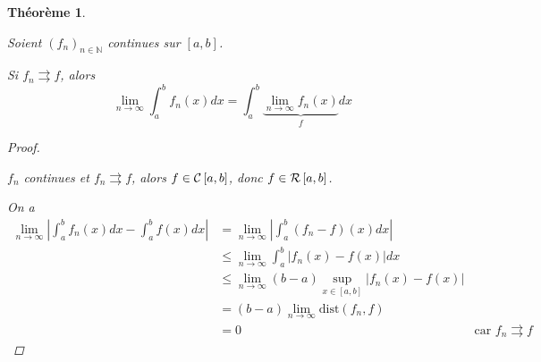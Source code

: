 \documentclass{report}
\newcommand*{\dlim}[3]{\displaystyle\lim_{#1 \to #2}#3}
\newcommand*{\dint}[3]{\displaystyle\int_{#1}^{#2}#3}
\newcommand*{\abs}[1]{\left| #1 \right|}
\newcommand*{\convuni}{\rightrightarrows}
\newcommand*{\lte}{\leqslant}
\newcommand*{\naturels}{\mathbb{N}}
\newtheorem*{thm}{Th\'eor\`eme}
\theoremstyle{definition}
\theoremstyle{remark}
\begin{document}
	\begin{thm}~

		Soient $(f_n)_{n \in \naturels}$ continues sur $[a,b]$.

		Si $f_n \convuni f$, alors
		\[
		\dlim{n}{\infty}{\dint{a}{b}{f_n(x)dx}} = \dint{a}{b}{\underbrace{\dlim{n}{\infty}{f_n(x)}}_{f}dx}
		\]
		\begin{proof}~

			$f_n$ continues et $f_n \convuni f$, alors $f \in \continue$, donc $f \in \riemann$.

			On a
			\begin{align*}
				\dlim{n}{\infty}{\abs{\dint{a}{b}{f_n(x)dx} - \dint{a}{b}{f(x)dx}}}&= \dlim{n}{\infty}{\abs{\dint{a}{b}{(f_n-f)(x)dx}}}\\
				&\lte \dlim{n}{\infty}{\dint{a}{b}{\abs{f_n(x)-f(x)}dx}}\\
				&\lte \dlim{n}{\infty}{(b-a) \sup\limits_{x \in [a,b]}\abs{f_n(x)-f(x)}}\\
				&= (b-a) \dlim{n}{\infty}{\mathrm{dist}(f_n,f)}\\
				&= 0&\text{car }f_n \convuni f
			\end{align*}
		\end{proof}
	\end{thm}
\end{document}
